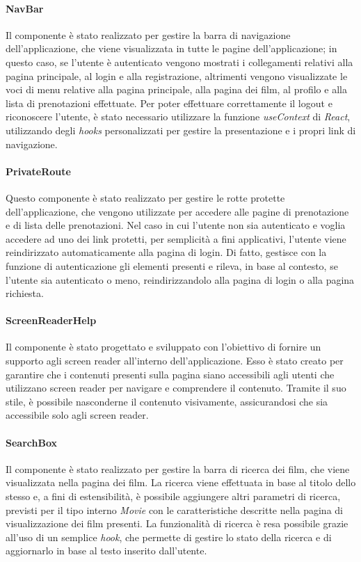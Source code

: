 \paragraph{NavBar}
Il componente è stato realizzato per gestire la barra di navigazione dell'applicazione, che viene visualizzata in tutte le pagine dell'applicazione; in questo caso, se l'utente è autenticato vengono
mostrati i collegamenti relativi alla pagina principale, al login e alla registrazione, altrimenti vengono visualizzate le voci di menu relative alla pagina principale, alla pagina dei film, al profilo e alla lista di prenotazioni effettuate.
Per poter effettuare correttamente il logout e riconoscere l'utente, è stato necessario utilizzare la funzione \textit{useContext} di \textit{React}, utilizzando degli \textit{hooks} personalizzati per
gestire la presentazione e i propri link di navigazione.

\paragraph{PrivateRoute}

Questo componente è stato realizzato per gestire le rotte protette dell'applicazione, che vengono utilizzate per accedere alle pagine di prenotazione e di lista delle prenotazioni.
Nel caso in cui l'utente non sia autenticato e voglia accedere ad uno dei link protetti, per semplicità a fini applicativi,
l'utente viene reindirizzato automaticamente alla pagina di login. Di fatto, gestisce con la funzione di autenticazione gli elementi presenti e rileva,
in base al contesto, se l'utente sia autenticato o meno, reindirizzandolo alla pagina di login o alla pagina richiesta.

\paragraph{ScreenReaderHelp}

Il componente è stato progettato e sviluppato con l'obiettivo di fornire un supporto agli screen reader all'interno dell'applicazione. 
Esso è stato creato per garantire che i contenuti presenti sulla pagina siano accessibili agli utenti che utilizzano screen reader per navigare e comprendere il contenuto.
Tramite il suo stile, è possibile nasconderne il contenuto visivamente, assicurandosi che sia accessibile solo agli screen reader.

\paragraph{SearchBox}

Il componente è stato realizzato per gestire la barra di ricerca dei film, che viene visualizzata nella pagina dei film.
La ricerca viene effettuata in base al titolo dello stesso e, a fini di estensibilità, è possibile aggiungere altri parametri di ricerca, previsti per il tipo interno \textit{Movie}
con le caratteristiche descritte nella pagina di visualizzazione dei film presenti.
La funzionalità di ricerca è resa possibile grazie all'uso di un semplice \textit{hook}, che permette di gestire lo stato della ricerca e di aggiornarlo in base al testo inserito dall'utente.